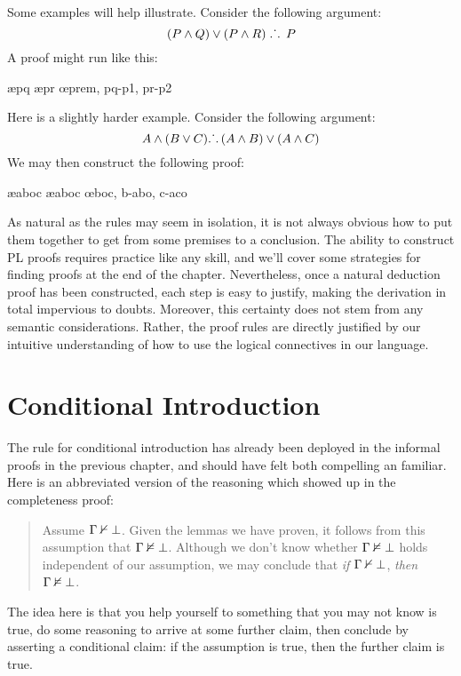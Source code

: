 Some examples will help illustrate.
Consider the following argument:
$$(P \wedge Q) \vee (P \wedge R) \; \ldotp\dot{}\,\ldotp \; P$$
A proof might run like this:
	\begin{fitchproof}
		 \pr{}
			\open
				 
				\ae{pq}
			\close
			\open
				 
				\ae{pr}
			\close
		\oe{prem, pq-p1, pr-p2}
	\end{fitchproof}
Here is a slightly harder example.
Consider the following argument:
	$$ A \wedge (B \vee C) \ldotp\dot{}\,\ldotp (A \wedge B) \vee (A \wedge C)$$
We may then construct the following proof:
	\begin{fitchproof}
		 \pr{}
		\ae{aboc}
		\ae{aboc}
		\open
			 \as{for \eor E}
			\ai{a,b}
			\have{abo}{(A \eand B) \eor (A \eand C)}\oi{ab}
		\close
		\open
			 \as{for \eor E}
			\ai{a,c}
			\have{aco}{(A \eand B) \eor (A \eand C)}\oi{ac}
		\close
	\oe{boc, b-abo, c-aco}
	\end{fitchproof}
As natural as the rules may seem in isolation, it is not always obvious how to put them together to get from some premises to a conclusion.
The ability to construct PL proofs requires practice like any skill, and we'll cover some strategies for finding proofs at the end of the chapter.
Nevertheless, once a natural deduction proof has been constructed, each step is easy to justify, making the derivation in total impervious to doubts.
Moreover, this certainty does not stem from any semantic considerations.
Rather, the proof rules are directly justified by our intuitive understanding of how to use the logical connectives in our language.




\section{Conditional Introduction}

The rule for conditional introduction has already been deployed in the informal proofs in the previous chapter, and should have felt both compelling an familiar.
Here is an abbreviated version of the reasoning which showed up in the completeness proof:
	\begin{quote}
		Assume $\Gamma \nvdash \bot$.
    Given the lemmas we have proven, it follows from this assumption that $\Gamma \nvDash \bot$.
    Although we don't know whether $\Gamma \nvDash \bot$ holds independent of our assumption, we may conclude that \textit{if} $\Gamma \nvdash \bot$, \textit{then} $\Gamma \nvDash \bot$. 
	\end{quote}
The idea here is that you help yourself to something that you may not know is true, do some reasoning to arrive at some further claim, then conclude by asserting a conditional claim: if the assumption is true, then the further claim is true.


